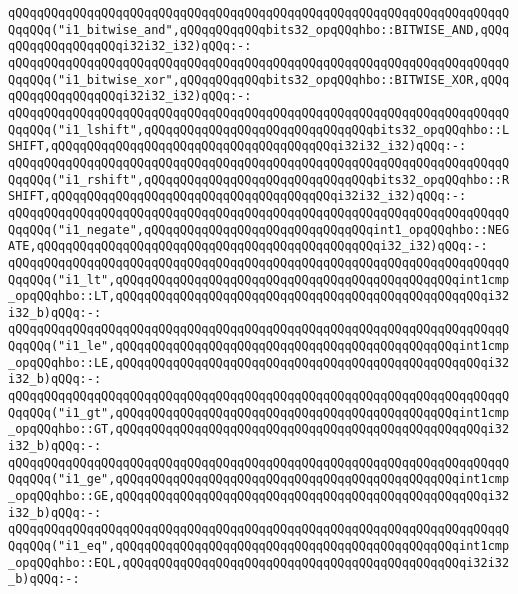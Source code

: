 \verb|qQQqqQQqqQQqqQQqqQQqqQQqqQQqqQQqqQQqqQQqqQQqqQQqqQQqqQQqqQQqqQQqqQQqqQQqqQQq("i1_bitwise_and",qQQqqQQqqQQqbits32_opqQQqhbo::BITWISE_AND,qQQqqQQqqQQqqQQqqQQqi32i32_i32)qQQq:-:|\newline
\verb|qQQqqQQqqQQqqQQqqQQqqQQqqQQqqQQqqQQqqQQqqQQqqQQqqQQqqQQqqQQqqQQqqQQqqQQqqQQq("i1_bitwise_xor",qQQqqQQqqQQqbits32_opqQQqhbo::BITWISE_XOR,qQQqqQQqqQQqqQQqqQQqi32i32_i32)qQQq:-:|\newline
\verb|qQQqqQQqqQQqqQQqqQQqqQQqqQQqqQQqqQQqqQQqqQQqqQQqqQQqqQQqqQQqqQQqqQQqqQQqqQQq("i1_lshift",qQQqqQQqqQQqqQQqqQQqqQQqqQQqqQQqbits32_opqQQqhbo::LSHIFT,qQQqqQQqqQQqqQQqqQQqqQQqqQQqqQQqqQQqqQQqi32i32_i32)qQQq:-:|\newline
\verb|qQQqqQQqqQQqqQQqqQQqqQQqqQQqqQQqqQQqqQQqqQQqqQQqqQQqqQQqqQQqqQQqqQQqqQQqqQQq("i1_rshift",qQQqqQQqqQQqqQQqqQQqqQQqqQQqqQQqbits32_opqQQqhbo::RSHIFT,qQQqqQQqqQQqqQQqqQQqqQQqqQQqqQQqqQQqqQQqi32i32_i32)qQQq:-:|\newline
\verb|qQQqqQQqqQQqqQQqqQQqqQQqqQQqqQQqqQQqqQQqqQQqqQQqqQQqqQQqqQQqqQQqqQQqqQQqqQQq("i1_negate",qQQqqQQqqQQqqQQqqQQqqQQqqQQqqQQqint1_opqQQqhbo::NEGATE,qQQqqQQqqQQqqQQqqQQqqQQqqQQqqQQqqQQqqQQqqQQqqQQqi32_i32)qQQq:-:|\newline
\verb|qQQqqQQqqQQqqQQqqQQqqQQqqQQqqQQqqQQqqQQqqQQqqQQqqQQqqQQqqQQqqQQqqQQqqQQqqQQq("i1_lt",qQQqqQQqqQQqqQQqqQQqqQQqqQQqqQQqqQQqqQQqqQQqqQQqint1cmp_opqQQqhbo::LT,qQQqqQQqqQQqqQQqqQQqqQQqqQQqqQQqqQQqqQQqqQQqqQQqqQQqi32i32_b)qQQq:-:|\newline
\verb|qQQqqQQqqQQqqQQqqQQqqQQqqQQqqQQqqQQqqQQqqQQqqQQqqQQqqQQqqQQqqQQqqQQqqQQqqQQq("i1_le",qQQqqQQqqQQqqQQqqQQqqQQqqQQqqQQqqQQqqQQqqQQqqQQqint1cmp_opqQQqhbo::LE,qQQqqQQqqQQqqQQqqQQqqQQqqQQqqQQqqQQqqQQqqQQqqQQqqQQqi32i32_b)qQQq:-:|\newline
\verb|qQQqqQQqqQQqqQQqqQQqqQQqqQQqqQQqqQQqqQQqqQQqqQQqqQQqqQQqqQQqqQQqqQQqqQQqqQQq("i1_gt",qQQqqQQqqQQqqQQqqQQqqQQqqQQqqQQqqQQqqQQqqQQqqQQqint1cmp_opqQQqhbo::GT,qQQqqQQqqQQqqQQqqQQqqQQqqQQqqQQqqQQqqQQqqQQqqQQqqQQqi32i32_b)qQQq:-:|\newline
\verb|qQQqqQQqqQQqqQQqqQQqqQQqqQQqqQQqqQQqqQQqqQQqqQQqqQQqqQQqqQQqqQQqqQQqqQQqqQQq("i1_ge",qQQqqQQqqQQqqQQqqQQqqQQqqQQqqQQqqQQqqQQqqQQqqQQqint1cmp_opqQQqhbo::GE,qQQqqQQqqQQqqQQqqQQqqQQqqQQqqQQqqQQqqQQqqQQqqQQqqQQqi32i32_b)qQQq:-:|\newline
\verb|qQQqqQQqqQQqqQQqqQQqqQQqqQQqqQQqqQQqqQQqqQQqqQQqqQQqqQQqqQQqqQQqqQQqqQQqqQQq("i1_eq",qQQqqQQqqQQqqQQqqQQqqQQqqQQqqQQqqQQqqQQqqQQqqQQqint1cmp_opqQQqhbo::EQL,qQQqqQQqqQQqqQQqqQQqqQQqqQQqqQQqqQQqqQQqqQQqqQQqi32i32_b)qQQq:-:|\newline
